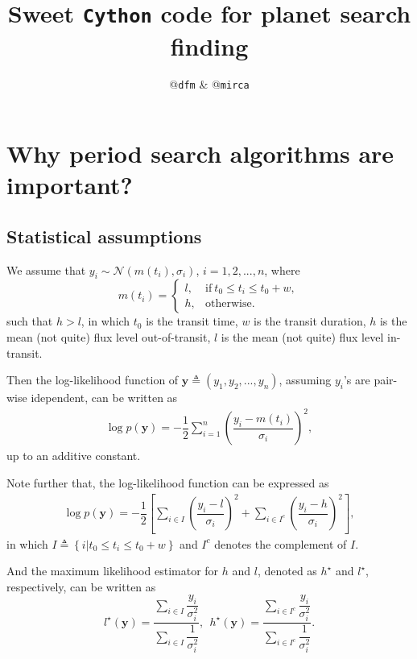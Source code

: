 \documentclass{article}
\title{Sweet \texttt{Cython} code for planet search finding}
\author{@\texttt{dfm} \& @\texttt{mirca}}
\begin{document}
\maketitle
\section{Why period search algorithms are important?}
\subsection{Statistical assumptions}
We assume that $y_i \sim \mathcal{N}(m(t_i), \sigma_i)$, $i=1, 2, ..., n$, where
\begin{equation}
m(t_i) =
\left\{
    \begin{array}{ll}
        l, & \text{if}~t_0 \leq t_i \leq t_0 + w ,\\
        h, & \text{otherwise}.
    \end{array}
\right.
\end{equation}
such that $h>l$, in which $t_0$ is the transit time, $w$ is the transit duration,
$h$ is the mean (not quite) flux level out-of-transit, $l$ is the mean (not quite)
flux level in-transit.

Then the log-likelihood function of $\bm{y} \triangleq (y_1, y_2, ..., y_n)$,
assuming $y_i$'s are pair-wise idependent, can be written as
\begin{align}
    \log p(\bm{y}) = -\dfrac{1}{2}\sum_{i=1}^{n}\left(\dfrac{y_i - m(t_i)}{\sigma_i}\right)^2,
\end{align}
up to an additive constant.

Note further that, the log-likelihood function can be expressed as
\begin{align}
    \log p(\bm{y}) = -\dfrac{1}{2}\left[\sum_{i \in I}\left(\dfrac{y_i - l}{\sigma_i}\right)^2
                                        + \sum_{i \in I^{c}}\left(\dfrac{y_i - h}{\sigma_i}\right)^2\right],
\end{align}
in which $I\triangleq\left\{i | t_0 \leq t_i \leq t_0 + w \right\}$ and $I^{c}$ denotes the complement of $I$.

And the maximum likelihood estimator for $h$ and $l$, denoted as $h^{\star}$ and $l^{\star}$,
respectively, can be written as
\begin{equation}
    l^{\star}(\bm{y}) = \dfrac{\displaystyle\sum_{i \in I}\dfrac{y_i}{\sigma^2_i}}{\displaystyle\sum_{i\in I}\dfrac{1}{\sigma^2_i}},
    ~~h^{\star}(\bm{y}) = \dfrac{\displaystyle\sum_{i \in I^{c}}\dfrac{y_i}{\sigma^2_i}}{\displaystyle\sum_{i\in I^{c}}\dfrac{1}{\sigma^2_i}}.
\end{equation}
\end{document}
